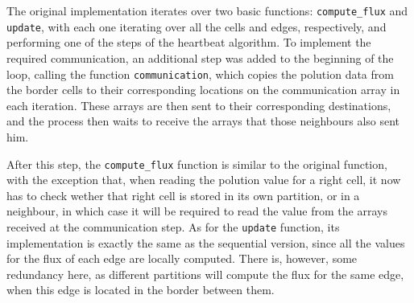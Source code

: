 The original implementation iterates over two basic functions: \texttt{compute\_flux} and \texttt{update}, with each one iterating over all the cells and edges, respectively, and performing one of the steps of the heartbeat algorithm. To implement the required communication, an additional step was added to the beginning of the loop, calling the function \texttt{communication}, which copies the polution data from the border cells to their corresponding locations on the communication array in each iteration. These arrays are then sent to their corresponding destinations, and the process then waits to receive the arrays that those neighbours also sent him.

After this step, the \texttt{compute\_flux} function is similar to the original function, with the exception that, when reading the polution value for a right cell, it now has to check wether that right cell is stored in its own partition, or in a neighbour, in which case it will be required to read the value from the arrays received at the communication step. As for the \texttt{update} function, its implementation is exactly the same as the sequential version, since all the values for the flux of each edge are locally computed. There is, however, some redundancy here, as different partitions will compute the flux for the same edge, when this edge is located in the border between them.